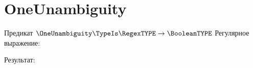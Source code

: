 \section{OneUnambiguity}
\begin{frame}{Предикат $\OneUnambiguity\TypeIs\RegexTYPE\to\BooleanTYPE$}
	Регулярное выражение:

	Результат:

\end{frame}
